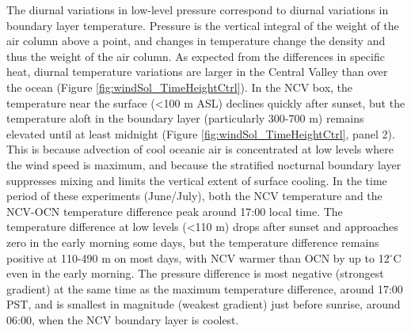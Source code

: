 The diurnal variations in low-level pressure correspond to diurnal variations in boundary layer temperature.  Pressure is the vertical integral of the weight of the air column above a point, and changes in temperature change the density and thus the weight of the air column.  As expected from the differences in specific heat, diurnal temperature variations are larger in the Central Valley than over the ocean (Figure \ref{fig:windSol_TimeHeightCtrl}).  In the NCV box, the temperature near the surface (\textless 100 m ASL) declines quickly after sunset, but the temperature aloft in the boundary layer (particularly 300-700 m) remains elevated until at least midnight (Figure \ref{fig:windSol_TimeHeightCtrl}, panel 2).  This is because advection of cool oceanic air is concentrated at low levels where the wind speed is maximum, and because the stratified nocturnal boundary layer suppresses mixing and limits the vertical extent of surface cooling.  In the time period of these experiments (June/July), both the NCV temperature and the NCV-OCN temperature difference peak around 17:00 local time.  The temperature difference at low levels (\textless 110 m) drops after sunset and approaches zero in the early morning some days, but the temperature difference remains positive at 110-490 m on most days, with NCV warmer than OCN by up to 12$^\circ$C even in the early morning.  The pressure difference is most negative (strongest gradient) at the same time as the maximum temperature difference, around 17:00 PST, and is smallest in magnitude (weakest gradient) just before sunrise, around 06:00, when the NCV boundary layer is coolest.  

